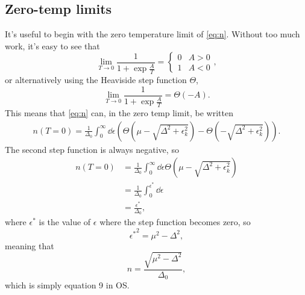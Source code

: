 \documentclass{article}
\newcommand{\corr}{\mu}
\newcommand{\step}{\Theta}
\begin{document}
\subsection{Zero-temp limits} \label{subsec:zerotemp}
It's useful to begin with the zero temperature limit of \cref{eq:n}.
Without too much work, it's easy to see that
\begin{equation}
	\lim_{T\rightarrow 0} \frac{1}{1 + \exp\frac{A}{T}} = \begin{cases}
		0 & A > 0 \\
		1 & A < 0
	\end{cases},
\end{equation}
or alternatively using the Heaviside step function $\step$,
\begin{equation}
	\lim_{T\rightarrow 0} \frac{1}{1 + \exp\frac{A}{T}} = \step(- A).
\end{equation}
This means that \cref{eq:n} can, in the zero temp limit, be written
\begin{align}
	n(T = 0) = \frac{1}{\Delta_0} \int_0^\infty \dd{\epsilon} \left(\step\left(\corr - \sqrt{\Delta^2 + \epsilon_k^2}\right) - \step\left(- \sqrt{\Delta^2 + \epsilon_k^2}\right) \right).
\end{align}
The second step function is always negative, so
\begin{align}
	n(T = 0) &= \frac{1}{\Delta_0} \int_0^\infty \dd{\epsilon} \step\left(\corr - \sqrt{\Delta^2 + \epsilon_k^2}\right) \\
	&= \frac{1}{\Delta_0} \int_0^{\epsilon^\ast} \dd{\epsilon}  \\
	&= \frac{\epsilon^\ast}{\Delta_0},
\end{align}
where $\epsilon^\ast$ is the value of $\epsilon$ where the step function becomes zero, so
\begin{equation}
	{\epsilon^\ast}^2 = \corr^2 - \Delta^2,
\end{equation}
meaning that
\begin{equation}
	n = \frac{\sqrt{\corr^2 - \Delta^2}}{\Delta_0}, \label{eq:os9}
\end{equation}
which is simply equation 9 in OS.
\end{document}
